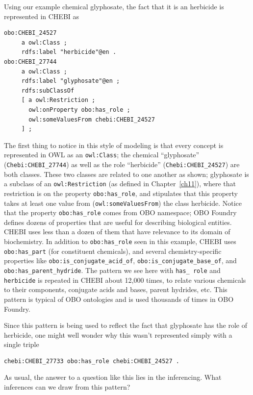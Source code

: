 Using our example chemical glyphosate, the fact that it is an herbicide
is represented in CHEBI as

\begin{lstlisting}
obo:CHEBI_24527
     a owl:Class ;
     rdfs:label "herbicide"@en .
obo:CHEBI_27744
     a owl:Class ;
     rdfs:label "glyphosate"@en ;
     rdfs:subClassOf
     [ a owl:Restriction ;
       owl:onProperty obo:has_role ;
       owl:someValuesFrom chebi:CHEBI_24527
     ] ;
\end{lstlisting}


The first thing to notice in this style of modeling is that every
concept is represented in OWL as an \texttt{owl:Class}; the chemical
``glyphosate'' (\texttt{Chebi:CHEBI\_27744}) as well as the role ``herbicide''
(\texttt{Chebi:CHEBI\_24527}) are both classes. These two classes are related to
one another as shown; glyphosate is a subclass of an \texttt{owl:Restriction} (as
defined in Chapter~\ref{ch11}), where that restriction is on the property
\texttt{obo:has\_role}, and stipulates that this property takes at least one
value from (\texttt{owl:someValuesFrom}) the class herbicide. Notice that the
property \texttt{obo:has\_role} comes from OBO namespace; OBO Foundry defines
dozens of properties that are useful for describing biological
entities. CHEBI uses less than a dozen of them that have relevance to
its domain of biochemistry. In addition to \texttt{obo:has\_role} seen in this
example, CHEBI uses \texttt{obo:has\_part} (for constituent chemicals), and
several chemistry-specific properties like \texttt{obo:is\_conjugate\_acid\_of},
\texttt{obo:is\_conjugate\_base\_of}, and \texttt{obo:has\_parent\_hydride}. The pattern
we see here with \texttt{has\_ role} and \texttt{herbicide} is repeated in CHEBI
about 12,000 times, to relate various chemicals to their components,
conjugate acids and bases, parent hydrides, etc. This pattern is typical
of OBO ontologies and is used thousands of times in OBO Foundry.

Since this pattern is being used to reflect the fact that glyphosate has
the role of herbicide, one might well wonder why this wasn't represented
simply with a single triple

\begin{lstlisting}
chebi:CHEBI_27733 obo:has_role chebi:CHEBI_24527 .
\end{lstlisting}

As usual, the answer to a question like this lies in the inferencing.
What inferences can we draw from this pattern?

